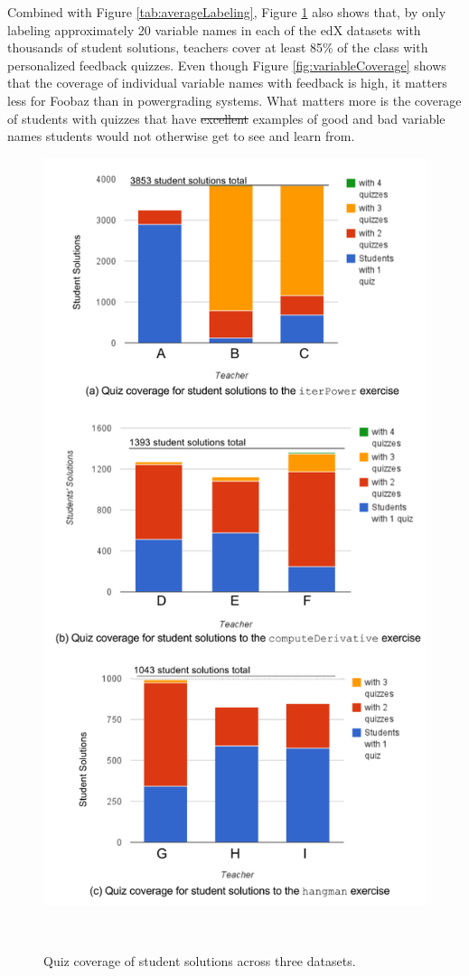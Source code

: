 \documentclass[12pt,twoside]{mitthesis}
\providecommand{\DIFdeltex}[1]{{\protect\color{red}\sout{#1}}}                      %
\providecommand{\DIFdelbegin}{} %
\providecommand{\DIFdelend}{} %
\providecommand{\DIFaddbeginFL}{} %
\providecommand{\DIFaddendFL}{} %
\providecommand{\DIFdelbeginFL}{} %
\providecommand{\DIFdelendFL}{} %
\providecommand{\DIFdel}[1]{\texorpdfstring{\DIFdeltex{#1}}{}} %
\begin{document}
{{{{{{{{{{Combined with Figure \ref{tab:averageLabeling}, Figure \ref{fig:comboquizcoverage} also shows that, by only labeling approximately 20 variable names in each of the edX datasets with thousands of student solutions, teachers cover at least 85\% of the class with personalized feedback quizzes. Even though Figure \ref{fig:variableCoverage} shows that the coverage of individual variable names with feedback is high, it matters less for Foobaz than in powergrading systems. What matters more is the coverage of students with quizzes that have \DIFdelbegin \DIFdel{excellent }\DIFdelend examples of good and bad variable names students would not otherwise get to see and learn from.

\begin{figure}
\begin{minipage}{1\columnwidth}
\centering
\DIFdelbeginFL %
\DIFdelendFL \DIFaddbeginFL \includegraphics[width=0.7\columnwidth]{Body/figures/foobaz/ComboQuizCoverageFigure2.png}
\DIFaddendFL \caption{Quiz coverage of student solutions across three datasets.}~\label{fig:comboquizcoverage}
\DIFdelbeginFL %
\DIFdelendFL 


\end{minipage}
\end{figure}}}}}}}}}}}
\end{document}
